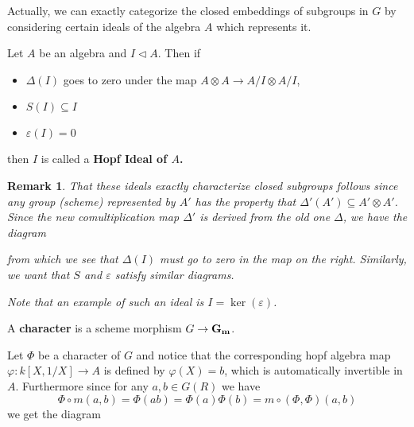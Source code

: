 \documentclass[12pt]{article}
\theoremstyle{nonumberbreak}
\theoremstyle{changebreak}
\theoremstyle{nonumberplain}
\theoremstyle{change}
\newtheorem{rmk}[thm]{Remark}
\DeclareMathOperator{\Gm}{\ensuremath\mathbf{G_m}}
\begin{document}
Actually, we can exactly categorize the closed embeddings of subgroups in $G$ by considering certain
ideals of the algebra $A$ which represents it. 
\begin{defn}
	Let $A$ be an algebra and $I\lhd A$. Then if 
	\begin{itemize}
		\item $\Delta(I)$ goes to zero under the map $A\otimes A\to A/I\otimes A/I$,
		\item $S(I)\subseteq I$
		\item $\varepsilon(I)=0$
	\end{itemize}
	then $I$ is called a \textbf{Hopf Ideal of $A$.}
\end{defn}

\begin{rmk}
	That these ideals exactly characterize closed subgroups follows since any group (scheme) represented
	by $A'$ has the property that $\Delta'(A')\subseteq A'\otimes A'$. Since the new comultiplication map
	$\Delta'$ is derived from the old one $\Delta$, we have the diagram
	\begin{figure}[h]
	\end{figure}
	
	\noindent from which we see that $\Delta(I)$ must go to zero in the map on the right.
	Similarly, we want that $S$ and $\varepsilon$ satisfy similar diagrams.

	Note that an example of such an ideal is $I=\ker(\varepsilon)$.
\end{rmk}

\begin{defn}
	A \textbf{character} is a scheme morphism $G\to \Gm$.
\end{defn}

Let $\Phi$ be a character of $G$ and notice that the corresponding hopf algebra map 
$\varphi:k[X,1/X]\to A$ is defined by $\varphi(X)=b$, which
is automatically invertible in $A$. Furthermore since for any $a,b\in G(R)$ we have
\[\Phi\circ m(a,b)=\Phi(ab)=\Phi(a)\Phi(b)=m\circ(\Phi,\Phi)(a,b)\]
we get the diagram
\begin{figure}[h]
\end{figure}
\end{document}
